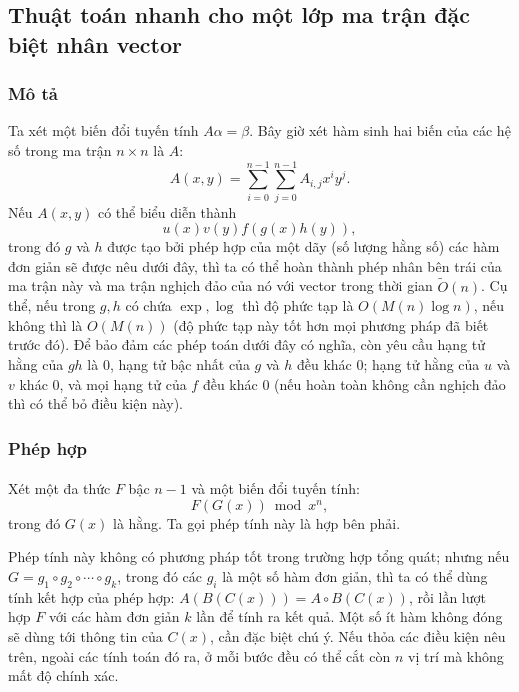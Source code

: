 \documentclass[11pt]{article}
\begin{document}
\subsection{Thuật toán nhanh cho một lớp ma trận đặc biệt nhân vector}

\subsubsection{Mô tả}

Ta xét một biến đổi tuyến tính \(A\alpha=\beta\). Bây giờ xét hàm sinh hai biến
của các hệ số trong ma trận \(n\times n\) là \(A\):
\[
  A(x,y)=\sum_{i=0}^{n-1}\sum_{j=0}^{n-1}A_{i,j}x^iy^j.
\]
Nếu \(A(x,y)\) có thể biểu diễn thành
\[
  u(x)v(y)f(g(x)h(y)),
\]
trong đó \(g\) và \(h\) được tạo bởi phép hợp của một dãy (số lượng hằng số)
các hàm đơn giản sẽ được nêu dưới đây, thì ta có thể hoàn thành phép nhân bên
trái của ma trận này và ma trận nghịch đảo của nó với vector trong thời gian
\(\widetilde{O}(n)\). Cụ thể, nếu trong \(g,h\) có chứa \(\exp,\log\) thì độ
phức tạp là \(O(M(n)\log n)\), nếu không thì là \(O(M(n))\) (độ phức tạp này
tốt hơn mọi phương pháp đã biết trước đó). Để bảo đảm các phép toán dưới đây có
nghĩa, còn yêu cầu hạng tử hằng của \(gh\) là \(0\), hạng tử bậc nhất của
\(g\) và \(h\) đều khác \(0\); hạng tử hằng của \(u\) và \(v\) khác \(0\), và
mọi hạng tử của \(f\) đều khác \(0\) (nếu hoàn toàn không cần nghịch đảo thì có
thể bỏ điều kiện này).

\subsubsection{Phép hợp}

\paragraph{}
Xét một đa thức \(F\) bậc \(n-1\) và một biến đổi tuyến tính:
\[
  F(G(x))\bmod x^n,
\]
trong đó \(G(x)\) là hằng. Ta gọi phép tính này là hợp bên phải.

Phép tính này không có phương pháp tốt trong trường hợp tổng quát; nhưng nếu
\(G=g_1\circ g_2\circ\cdots\circ g_k\), trong đó các \(g_i\) là một số hàm đơn
giản, thì ta có thể dùng tính kết hợp của phép hợp:
\(A(B(C(x)))=A\circ B(C(x))\), rồi lần lượt hợp \(F\) với các hàm đơn giản
\(k\) lần để tính ra kết quả. Một số ít hàm không đóng sẽ dùng tới thông tin
của \(C(x)\), cần đặc biệt chú ý. Nếu thỏa các điều kiện nêu trên, ngoài các
tính toán đó ra, ở mỗi bước đều có thể cắt còn \(n\) vị trí mà không mất độ
chính xác.
\end{document}
